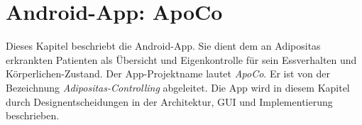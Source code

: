 

\chapter{Android-App: ApoCo}

Dieses Kapitel beschriebt die Android-App.
Sie dient dem an Adipositas erkrankten Patienten als \"Ubersicht und Eigenkontrolle f\"ur sein Essverhalten und K\"orperlichen-Zustand.
Der App-Projektname lautet \emph{ApoCo}. Er ist von der Bezeichnung \emph{Adipositas-Controlling} abgeleitet.
Die App wird in diesem Kapitel durch Designentscheidungen in der Architektur, GUI und Implementierung beschrieben.


% 
% 
%  
% 
%  
%   

